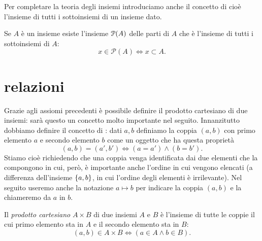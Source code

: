 Per completare la teoria degli insiemi introduciamo anche il concetto di
% 
cioè l'insieme di tutti i sottoinsiemi di un insieme dato.
\begin{axiom}
\label{def:insieme_parti}%
Se $A$ è un insieme esiste l'insieme $\P(A)$ delle parti di $A$
che è l'insieme di tutti i sottoinsiemi di $A$:
\begin{equation}\label{eq:insieme_delle_parti}
  x \in \mathcal P(A) \iff x \subset A.
\end{equation}
\end{axiom}

\section{relazioni}

Grazie agli assiomi precedenti è possibile definire il prodotto cartesiano
di due insiemi: sarà questo un concetto molto importante nel seguito.
Innanzitutto dobbiamo definire il concetto di : dati
$a,b$ definiamo la coppia $(a,b)$ con primo elemento $a$ e secondo elemento $b$
come un oggetto che ha questa proprietà%
%
\begin{equation}\label{eq:coppia}
  (a, b) = (a', b') \iff (a=a') \land (b=b').
\end{equation}
Stiamo cioè richiedendo che una coppia venga identificata dai due
elementi che la compongono in cui, però, è importante anche l'ordine in
cui vengono elencati (a differenza dell'insieme $\ENCLOSE{a,b}$, in cui
l'ordine degli elementi è irrilevante).
Nel seguito useremo anche la notazione $a \mapsto b$ per indicare 
la coppia $(a,b)$ e la chiameremo  da $a$ in $b$.

Il \emph{prodotto cartesiano} $A\times B$ di due insiemi $A$ e $B$
è l'insieme di tutte le coppie
il cui primo elemento sta in $A$ e
il secondo elemento sta in $B$:
\[
  (a, b) \in A \times B \iff (a\in A \land b\in B).
\]


